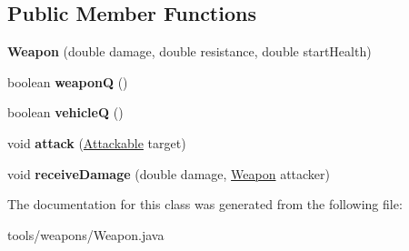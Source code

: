 \subsection*{Public Member Functions}
\begin{DoxyCompactItemize}
\item 
{\bfseries Weapon} (double damage, double resistance, double start\+Health)\hypertarget{classtools_1_1weapons_1_1_weapon_a21243dfd5e2fc8a8181d55596f7d979a}{}\label{classtools_1_1weapons_1_1_weapon_a21243dfd5e2fc8a8181d55596f7d979a}

\item 
boolean {\bfseries weaponQ} ()\hypertarget{classtools_1_1weapons_1_1_weapon_a84e27a7459b2c66589626d39408960f2}{}\label{classtools_1_1weapons_1_1_weapon_a84e27a7459b2c66589626d39408960f2}

\item 
boolean {\bfseries vehicleQ} ()\hypertarget{classtools_1_1weapons_1_1_weapon_af8f14a769b8fa4befc347e7c664a6b22}{}\label{classtools_1_1weapons_1_1_weapon_af8f14a769b8fa4befc347e7c664a6b22}

\item 
void {\bfseries attack} (\hyperlink{interfacetools_1_1weapons_1_1_attackable}{Attackable} target)\hypertarget{classtools_1_1weapons_1_1_weapon_a7b025e9a443897e93c81ad4327898bc2}{}\label{classtools_1_1weapons_1_1_weapon_a7b025e9a443897e93c81ad4327898bc2}

\item 
void {\bfseries receive\+Damage} (double damage, \hyperlink{classtools_1_1weapons_1_1_weapon}{Weapon} attacker)\hypertarget{classtools_1_1weapons_1_1_weapon_a823830aa0bc73f744d022d9b73b62aec}{}\label{classtools_1_1weapons_1_1_weapon_a823830aa0bc73f744d022d9b73b62aec}

\end{DoxyCompactItemize}


The documentation for this class was generated from the following file\+:\begin{DoxyCompactItemize}
\item 
tools/weapons/Weapon.\+java\end{DoxyCompactItemize}
